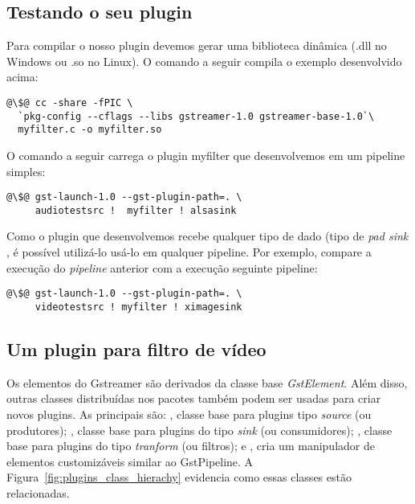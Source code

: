\subsection*{Testando o seu plugin}
Para compilar o nosso plugin devemos gerar uma biblioteca dinâmica (.dll no
Windows ou .so no Linux).  O comando a seguir compila o exemplo desenvolvido
acima:

\begin{lstlisting}[style=command]
@\$@ cc -share -fPIC \
  `pkg-config --cflags --libs gstreamer-1.0 gstreamer-base-1.0`\
  myfilter.c -o myfilter.so
\end{lstlisting}

O comando a seguir carrega o plugin myfilter que desenvolvemos em um pipeline
simples:

\begin{lstlisting}[style=command]
@\$@ gst-launch-1.0 --gst-plugin-path=. \
     audiotestsrc !  myfilter ! alsasink
\end{lstlisting}

Como o plugin que desenvolvemos recebe qualquer tipo de dado (tipo de \emph{pad
sink} \C{ANY}, é possível utilizá-lo usá-lo em qualquer pipeline.  Por exemplo,
compare a execução do \emph{pipeline} anterior com a execução seguinte
pipeline:

\begin{lstlisting}[style=command]
@\$@ gst-launch-1.0 --gst-plugin-path=. \
     videotestsrc ! myfilter ! ximagesink
\end{lstlisting}

\subsection*{Um plugin para filtro de vídeo}
Os elementos do Gstreamer são derivados da classe base \emph{GstElement}.  Além
disso, outras classes distribuídas nos pacotes  também podem
ser usadas para criar novos plugins.  As principais são: , classe
base para plugins tipo \emph{source} (ou produtores); , classe
base para plugins do tipo \emph{sink} (ou consumidores); \C{GstBaseTransform},
classe base para plugins do tipo \emph{tranform} (ou filtros); e \C{GstBin},
cria um manipulador de elementos customizáveis similar ao GstPipeline.  A
Figura~\ref{fig:plugins_class_hierachy} evidencia como essas classes estão
relacionadas.

